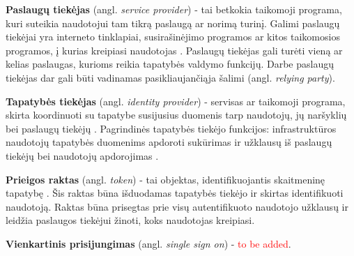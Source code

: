 \textbf{Paslaugų tiekėjas} (angl. \textit{service provider}) - tai betkokia taikomoji programa, kuri suteikia naudotojui tam tikrą paslaugą ar
norimą turinį. Galimi paslaugų tiekėjai yra interneto tinklapiai, susirašinėjimo programos ar kitos taikomosios programos,
į kurias kreipiasi naudotojas \cite{Pashalidis2003, Samar1999}. Paslaugų tiekėjas gali turėti vieną ar kelias paslaugas,
kurioms reikia tapatybės valdymo funkcijų. Darbe paslaugų tiekėjas dar gali būti vadinamas pasikliaujančiąja šalimi (angl.
\textit{relying party}).

\textbf{Tapatybės tiekėjas} (angl. \textit{identity provider}) - servisas ar taikomoji programa, skirta koordinuoti su tapatybe
susijusius duomenis tarp naudotojų, jų naršyklių bei paslaugų tiekėjų \cite{Strictest2011}. Pagrindinės tapatybės tiekėjo funkcijos:
infrastruktūros naudotojų tapatybės duomenims apdoroti sukūrimas ir užklausų iš paslaugų tiekėjų bei naudotojų apdorojimas \cite{Cao2010}.

\textbf{Prieigos raktas} (angl. \textit{token}) - tai objektas, identifikuojantis skaitmeninę tapatybę \cite{TokenDefinition}.
Šis raktas būna išduodamas tapatybės tiekėjo ir skirtas identifikuoti naudotoją. Raktas
būna prisegtas prie visų autentifikuoto naudotojo užklausų ir leidžia paslaugos tiekėjui žinoti, koks naudotojas kreipiasi.

\textbf{Vienkartinis prisijungimas} (angl. \textit{single sign on}) - \textcolor{red}{to be added}.